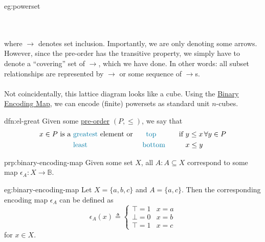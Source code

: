 \begin{eg}{eg:powerset}
    \\ \\
    where \( \longrightarrow \) denotes set inclusion.
    Importantly, we are only denoting some arrows.
    However, since the pre-order has the transitive property, we simply have to denote a ``covering'' set of \( \longrightarrow \), which we have done.
    In other words: all subset relationships are represented by \( \longrightarrow \) or some sequence of \( \longrightarrow \)s.
    \\ \\
    Not coincidentally, this lattice diagram looks like a cube.
    Using the \hyperref[eg:binary-encoding-map]{Binary Encoding Map}, we can encode (finite) powersets as standard unit \( n \)-cubes.
\end{eg}

\begin{dfn}{dfn:el-great}
    Given some \hyperref[dfn:pre-order]{pre-order} \( (P, \leq) \), we say that
    \begin{alignat*}{3}
        x \in P \text{ is a }
        &\text{\textcolor{dfn-color}{greatest}} \text{ element or }
        &\text{\textcolor{dfn-color}{top}} \hspace{1cm} \text{ if }
        &y \leq x \, \forall y \in P \\
        &\text{\textcolor{dfn-color}{least}} &\text{\textcolor{dfn-color}{bottom}} \hspace{1cm}
        &x \leq y
    \end{alignat*}
\end{dfn}

\begin{prp}{prp:binary-encoding-map}
    Given some set \( X \), all \( A : A \subseteq X \) correspond to some map \( \epsilon_{A} : X \to \mathbb{B} \).
\end{prp}
\newpage
\begin{eg}{eg:binary-encoding-map}
    Let \( X = \{ a, b, c \} \) and \( A = \{ a, c \} \).
    Then the corresponding encoding map \( \epsilon_{A} \) can be defined as
    \[
        \epsilon_{A}(x) \triangleq
        \begin{cases}
            \top = 1 & x = a \\
            \bot = 0 & x = b \\
            \top = 1 & x = c
        \end{cases}
    \]
    for \( x \in X \).
\end{eg}

